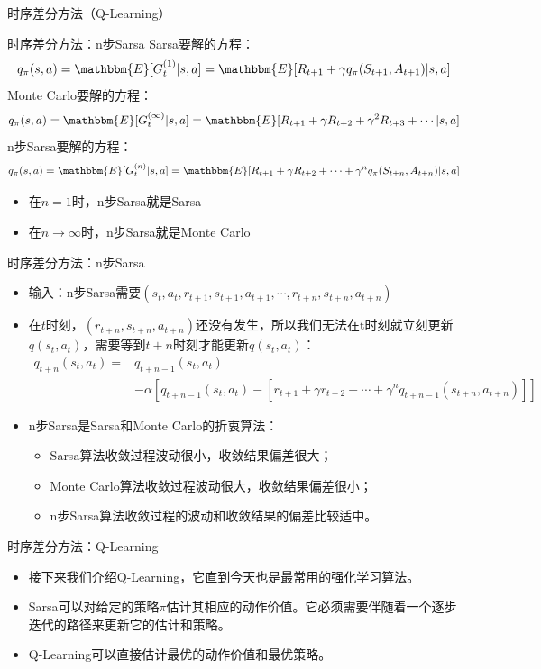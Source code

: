 \begin{section}{时序差分方法\alert{（Q-Learning）}}
\begin{frame}{时序差分方法：n步Sarsa}
    Sarsa要解的方程：
    \[
        q_\pi(s,a)=\mathbbm{E}[G_t^{(1)}|s, a]=\mathbbm{E}[R_{t+1}+\gamma q_\pi(S_{t+1}, A_{t+1})|s, a]
    \]
    Monte Carlo要解的方程：
    \[
        q_\pi(s,a)=\mathbbm{E}[G_t^{(\infty)}|s, a]=\mathbbm{E}[R_{t+1}+\gamma R_{t+2}+\gamma^2 R_{t+3}+\cdots|s, a]
    \]
    \alert{n步Sarsa要解的方程：}
    \[
        q_\pi(s,a)=\mathbbm{E}[G_t^{(n)}|s, a]=\mathbbm{E}[R_{t+1}+\gamma R_{t+2}+\cdots+\gamma^n q_\pi(S_{t+n}, A_{t+n})|s, a]
    \]
    \begin{itemize}
        \item 在$n=1$时，n步Sarsa就是Sarsa
        \item 在$n\rightarrow\infty$时，n步Sarsa就是Monte Carlo
    \end{itemize}
\end{frame}

\begin{frame}{时序差分方法：n步Sarsa}
    \begin{itemize}
        \item 输入：n步Sarsa需要$(s_t,a_t,r_{t+1},s_{t+1},a_{t+1},\cdots,r_{t+n},s_{t+n},a_{t+n})$
        \item 在$t$时刻，$(r_{t+n},s_{t+n},a_{t+n})$还没有发生，所以我们无法在t时刻就立刻更新$q(s_t, a_t)$，需要等到$t+n$时刻才能更新$q(s_t,a_t)$：
        \[
            \begin{aligned}
                q_{t+n}(s_t,a_t)=&q_{t+n-1}(s_t, a_t)\\
                &-\alpha[q_{t+n-1}(s_t,a_t)-[r_{t+1}+\gamma r_{t+2}+\cdots+\gamma^nq_{t+n-1}(s_{t+n}, a_{t+n})]]
            \end{aligned}
        \]
        \item n步Sarsa是Sarsa和Monte Carlo的折衷算法：
        \begin{itemize}
            \item Sarsa算法收敛过程波动很小，收敛结果偏差很大；
            \item Monte Carlo算法收敛过程波动很大，收敛结果偏差很小；
            \item n步Sarsa算法收敛过程的波动和收敛结果的偏差比较适中。
        \end{itemize}
    \end{itemize}
\end{frame}

\begin{frame}{时序差分方法：\alert{Q-Learning}}
    \begin{itemize}
        \item 接下来我们介绍\alert{Q-Learning}，它直到今天也是最常用的强化学习算法。
        \item Sarsa可以对给定的策略$\pi$估计其相应的动作价值。它必须需要伴随着一个逐步迭代的路径来更新它的估计和策略。
        \item \alert{Q-Learning}可以直接估计最优的动作价值和最优策略。
    \end{itemize}
\end{frame}


\end{section}
